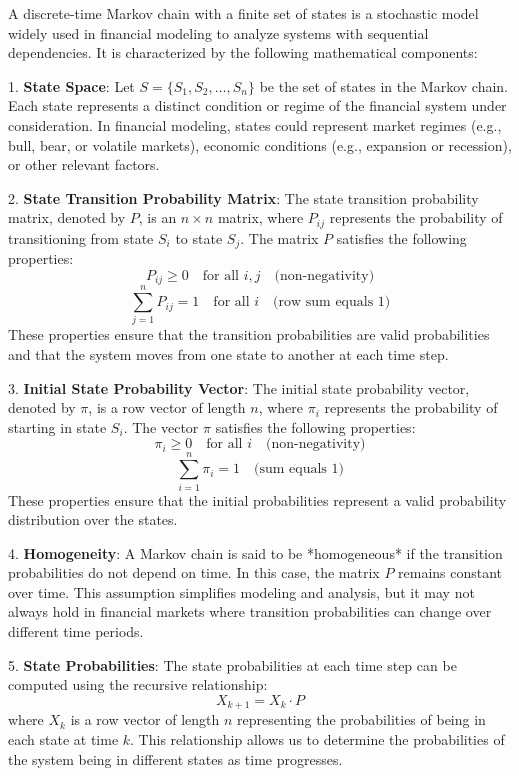 \documentclass[a4paper,11pt]{article}
\begin{document}
A discrete-time Markov chain with a finite set of states is a stochastic model widely used in financial modeling to analyze systems with sequential dependencies. It is characterized by the following mathematical components:

1. \textbf{State Space}: Let $S = \{S_1, S_2, \ldots, S_n\}$ be the set of states in the Markov chain. Each state represents a distinct condition or regime of the financial system under consideration. In financial modeling, states could represent market regimes (e.g., bull, bear, or volatile markets), economic conditions (e.g., expansion or recession), or other relevant factors.

2. \textbf{State Transition Probability Matrix}: The state transition probability matrix, denoted by $P$, is an $n \times n$ matrix, where $P_{ij}$ represents the probability of transitioning from state $S_i$ to state $S_j$. The matrix $P$ satisfies the following properties:
\[
P_{ij} \geq 0 \quad \text{for all } i, j \quad \text{(non-negativity)}
\]
\[
\sum_{j=1}^{n} P_{ij} = 1 \quad \text{for all } i \quad \text{(row sum equals 1)}
\]
These properties ensure that the transition probabilities are valid probabilities and that the system moves from one state to another at each time step.

3. \textbf{Initial State Probability Vector}: The initial state probability vector, denoted by $\pi$, is a row vector of length $n$, where $\pi_i$ represents the probability of starting in state $S_i$. The vector $\pi$ satisfies the following properties:
\[
\pi_i \geq 0 \quad \text{for all } i \quad \text{(non-negativity)}
\]
\[
\sum_{i=1}^{n} \pi_i = 1 \quad \text{(sum equals 1)}
\]
These properties ensure that the initial probabilities represent a valid probability distribution over the states.

4. \textbf{Homogeneity}: A Markov chain is said to be *homogeneous* if the transition probabilities do not depend on time. In this case, the matrix $P$ remains constant over time. This assumption simplifies modeling and analysis, but it may not always hold in financial markets where transition probabilities can change over different time periods.

5. \textbf{State Probabilities}: The state probabilities at each time step can be computed using the recursive relationship:
\[
X_{k+1} = X_k \cdot P
\]
where $X_k$ is a row vector of length $n$ representing the probabilities of being in each state at time $k$. This relationship allows us to determine the probabilities of the system being in different states as time progresses.
\end{document}
